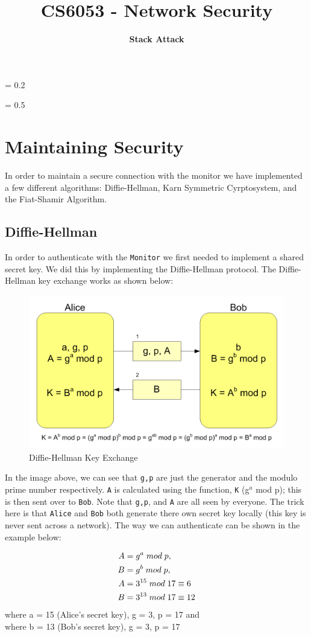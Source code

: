 \documentclass[10pt]{article}
\title{
    \vspace{2in}
    \textmd{\textbf{CS6053 - Network Security}}\\
    \vspace{4in}
}
\author{\textbf{Stack Attack}}
\begin{document}
\maketitle
\newpage
\parskip = 0.2\baselineskip
\newpage
\tableofcontents
\listoffigures
\listoftables
\parskip = 0.5\baselineskip
\newpage

\section{Maintaining Security}

In order to maintain a secure connection with the monitor we have implemented a
few different algorithms: Diffie-Hellman, Karn Symmetric Cyrptosystem, and the
Fiat-Shamir Algorithm.

\subsection{Diffie-Hellman}
In order to authenticate with the \texttt{Monitor} we first needed to implement
a shared secret key. We did this by implementing the Diffie-Hellman protocol. The
Diffie-Hellman key exchange works as shown below:
\begin{figure}[H]
    \centering
    \includegraphics[width=0.4\linewidth]{./diffie_hellman.png}
    \caption{Diffie-Hellman Key Exchange}
\end{figure}
In the image above, we can see that \texttt{g,p} are just the generator and
the modulo prime number respectively. \texttt{A} is calculated using the
function, \texttt{K} (g$^{a}$ mod p); this is then sent over to \texttt{Bob}.
Note that \texttt{g,p}, and \texttt{A} are all seen by everyone. The trick here
is that \texttt{Alice} and \texttt{Bob} both generate there own secret key
locally (this key is never sent across a network). The way we can authenticate
can be shown in the example below:

\begin{align*}
    A &= g^{a} \thickspace mod \thickspace p,  \\
    B &= g^{b} \thickspace mod \thickspace p,  \\
    A &= 3^{15} \thickspace mod \thickspace 17 \equiv 6 \\
    B &= 3^{13} \thickspace mod \thickspace 17 \equiv 12 \\
\end{align*}
where a = 15 (Alice's secret key), g = 3, p = 17 and \\
where b = 13 (Bob's secret key),   g = 3, p = 17 \\
\end{document}
